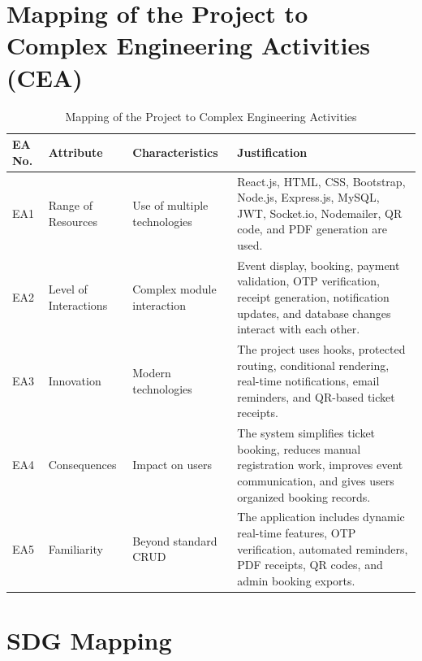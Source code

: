 \documentclass[12pt]{report}
\begin{document}
\section{Mapping of the Project to Complex Engineering Activities (CEA)}

\begin{table}[H]
\centering
\caption{Mapping of the Project to Complex Engineering Activities}
\renewcommand{\arraystretch}{1.25}
\begin{tabular}{|p{1.6cm}|p{3.2cm}|p{4.2cm}|p{6cm}|}
\hline
\rowcolor{gray!30}
\textbf{EA No.} & \textbf{Attribute} & \textbf{Characteristics} & \textbf{Justification}\\
\hline
EA1 & Range of Resources & Use of multiple technologies & React.js, HTML, CSS, Bootstrap, Node.js, Express.js, MySQL, JWT, Socket.io, Nodemailer, QR code, and PDF generation are used.\\
\hline
EA2 & Level of Interactions & Complex module interaction & Event display, booking, payment validation, OTP verification, receipt generation, notification updates, and database changes interact with each other.\\
\hline
EA3 & Innovation & Modern technologies & The project uses hooks, protected routing, conditional rendering, real-time notifications, email reminders, and QR-based ticket receipts.\\
\hline
EA4 & Consequences & Impact on users & The system simplifies ticket booking, reduces manual registration work, improves event communication, and gives users organized booking records.\\
\hline
EA5 & Familiarity & Beyond standard CRUD & The application includes dynamic real-time features, OTP verification, automated reminders, PDF receipts, QR codes, and admin booking exports.\\
\hline
\end{tabular}
\end{table}

\section{SDG Mapping}
\end{document}
